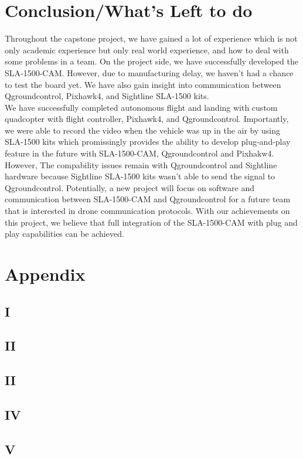 \documentclass[11pt]{article}
\begin{document}
\section{Conclusion/What's Left to do}
Throughout the capstone project, we have gained a lot of experience which is not only academic experience but only real world experience, and how to deal with some problems in a team. On the project side, we have successfully developed the SLA-1500-CAM. However, due to manufacturing delay, we haven't had a chance to test the board yet. We have also gain insight into communication between Qgroundcontrol, Pixhawk4, and Sightline SLA-1500 kits. \\
We have successfully completed autonomous flight and landing with custom quadcopter with flight controller, Pixhawk4, and Qgroundcontrol. Importantly, we were able to record the video when the vehicle was up in the air by using SLA-1500 kits which promissingly provides the ability to develop plug-and-play feature in the future with SLA-1500-CAM, Qgroundcontrol and Pixhakw4. \\
However, The compability issues remain with Qgroundcontrol and Sightline hardware because Sightline SLA-1500 kits wasn't able to send the signal to Qgroundcontrol. Potentially, a new project will focus on software and communication between SLA-1500-CAM and Qgroundcontrol for a future team that is interested in drone communication protocols. With our achievements on this project, we believe that full integration of the SLA-1500-CAM with plug and play capabilities can be achieved.     

\pagebreak

\section{Appendix}
\subsection{I}
\subsection{II}
\subsection{II}
\subsection{IV}
\subsection{V}	
\end{document}
